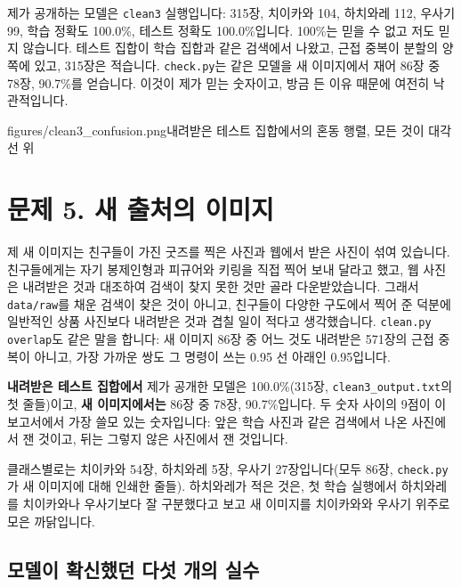 \documentclass[11pt]{article}
\begin{document}

제가 공개하는 모델은 \texttt{clean3} 실행입니다: 315장, 치이카와 104,
하치와레 112, 우사기 99, 학습 정확도 100.0\%, 테스트 정확도 100.0\%입니다.
100\%는 믿을 수 없고 저도 믿지 않습니다. 테스트 집합이 학습 집합과 같은
검색에서 나왔고, 근접 중복이 분할의 양쪽에 있고, 315장은 적습니다.
\texttt{check.py}는 같은 모델을 새 이미지에서 재어 86장 중 78장, 90.7\%를
얻습니다. 이것이 제가 믿는 숫자이고, 방금 든 이유 때문에 여전히 낙관적입니다.

           {figures/clean3_confusion.png}{내려받은 테스트 집합에서의 혼동
행렬, 모든 것이 대각선 위}

\section*{문제 5. 새 출처의 이미지}

제 새 이미지는 친구들이 가진 굿즈를 찍은 사진과 웹에서 받은 사진이 섞여
있습니다. 친구들에게는 자기 봉제인형과 피규어와 키링을 직접 찍어 보내 달라고
했고, 웹 사진은 내려받은 것과 대조하여 검색이 찾지 못한 것만 골라
다운받았습니다. 그래서 \texttt{data/raw}를 채운 검색이 찾은 것이 아니고,
친구들이 다양한 구도에서 찍어 준 덕분에 일반적인 상품 사진보다 내려받은 것과
겹칠 일이 적다고 생각했습니다.
\texttt{clean.py overlap}도 같은 말을 합니다: 새 이미지 86장 중 어느 것도
내려받은 571장의 근접 중복이 아니고, 가장 가까운 쌍도 그 명령이 쓰는 0.95 선
아래인 0.95입니다.


\textbf{내려받은 테스트 집합에서} 제가 공개한 모델은 100.0\%(315장,
\texttt{clean3\_output.txt}의 첫 줄들)이고, \textbf{새 이미지에서는} 86장 중
78장, 90.7\%입니다. 두 숫자 사이의 9점이 이 보고서에서 가장 쓸모 있는
숫자입니다: 앞은 학습 사진과 같은 검색에서 나온 사진에서 잰 것이고, 뒤는 그렇지
않은 사진에서 잰 것입니다.

클래스별로는 치이카와 54장, 하치와레 5장, 우사기 27장입니다(모두 86장,
\texttt{check.py}가 새 이미지에 대해 인쇄한 줄들). 하치와레가 적은 것은, 첫
학습 실행에서 하치와레를 치이카와나 우사기보다 잘 구분했다고 보고 새 이미지를
치이카와와 우사기 위주로 모은 까닭입니다.

\subsection*{모델이 확신했던 다섯 개의 실수}
\end{document}
